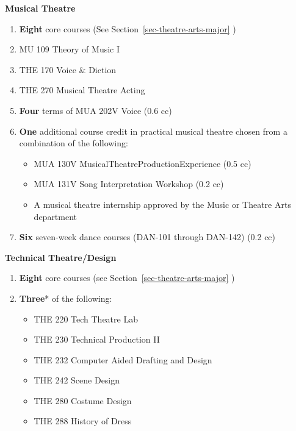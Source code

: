 \documentclass[
  letterpaper,
]{scrbook}
\providecommand{\tightlist}{%
  \setlength{\itemsep}{0pt}\setlength{\parskip}{0pt}}
\begin{document}
\textbf{Musical Theatre}

\begin{enumerate}
\def\labelenumi{\arabic{enumi}.}
\item
  \textbf{Eight} core courses (See Section~\ref{sec-theatre-arts-major}
  )
\item
  MU 109 Theory of Music I
\item
  THE 170 Voice \& Diction
\item
  THE 270 Musical Theatre Acting
\item
  \textbf{Four} terms of MUA 202V Voice (0.6 cc)
\item
  \textbf{One} additional course credit in practical musical theatre
  chosen from a combination of the following:

  \begin{itemize}
  \tightlist
  \item
    MUA 130V MusicalTheatreProductionExperience (0.5 cc)
  \item
    MUA 131V Song Interpretation Workshop (0.2 cc)
  \item
    A musical theatre internship approved by the Music or Theatre Arts
    department
  \end{itemize}
\item
  \textbf{Six} seven-week dance courses (DAN-101 through DAN-142) (0.2
  cc)
\end{enumerate}

\textbf{Technical Theatre/Design}

\begin{enumerate}
\def\labelenumi{\arabic{enumi}.}
\item
  \textbf{Eight} core courses (see Section~\ref{sec-theatre-arts-major}
  )
\item
  \textbf{Three}* of the following:

  \begin{itemize}
  \tightlist
  \item
    THE 220 Tech Theatre Lab
  \item
    THE 230 Technical Production II
  \item
    THE 232 Computer Aided Drafting and Design
  \item
    THE 242 Scene Design
  \item
    THE 280 Costume Design
  \item
    THE 288 History of Dress
  \end{itemize}
\end{enumerate}
\end{document}
